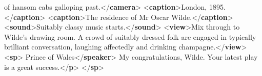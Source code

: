 \begin{shaded}
 of hansom cabs galloping past.{</\textbf{camera}>}\mbox{}\newline 
{<\textbf{caption}>}London, 1895.{</\textbf{caption}>}\mbox{}\newline 
{<\textbf{caption}>}The residence of Mr Oscar Wilde.{</\textbf{caption}>}\mbox{}\newline 
{<\textbf{sound}>}Suitably classy music starts.{</\textbf{sound}>}\mbox{}\newline 
{<\textbf{view}>}Mix through to Wilde's drawing room. A crowd of suitably\mbox{}\newline 
 dressed folk are engaged in typically brilliant conversation,\mbox{}\newline 
 laughing affectedly and drinking champagne.{</\textbf{view}>}\mbox{}\newline 
{<\textbf{sp}>}\mbox{}\newline 
{}Prince of Wales{</\textbf{speaker}>}\mbox{}\newline 
{}My congratulations, Wilde. Your latest play is a great success.{</\textbf{p}>}\mbox{}\newline 
{</\textbf{sp}>}\end{shaded}\egroup\par \noindent  
